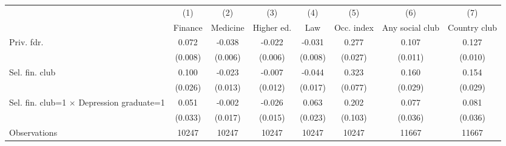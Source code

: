 \begin{tabular}{l*{7}{c}}
\toprule
                    &\multicolumn{1}{c}{(1)}&\multicolumn{1}{c}{(2)}&\multicolumn{1}{c}{(3)}&\multicolumn{1}{c}{(4)}&\multicolumn{1}{c}{(5)}&\multicolumn{1}{c}{(6)}&\multicolumn{1}{c}{(7)}\\
                    &\multicolumn{1}{c}{Finance}&\multicolumn{1}{c}{Medicine}&\multicolumn{1}{c}{Higher ed.}&\multicolumn{1}{c}{Law}&\multicolumn{1}{c}{Occ. index}&\multicolumn{1}{c}{Any social club}&\multicolumn{1}{c}{Country club}\\
\midrule
Priv. fdr.          &       0.072&      -0.038&      -0.022&      -0.031&       0.277&       0.107&       0.127\\
                    &     (0.008)&     (0.006)&     (0.006)&     (0.008)&     (0.027)&     (0.011)&     (0.010)\\
\addlinespace
Sel. fin. club      &       0.100&      -0.023&      -0.007&      -0.044&       0.323&       0.160&       0.154\\
                    &     (0.026)&     (0.013)&     (0.012)&     (0.017)&     (0.077)&     (0.029)&     (0.029)\\
\addlinespace
Sel. fin. club=1 $\times$ Depression graduate=1&       0.051&      -0.002&      -0.026&       0.063&       0.202&       0.077&       0.081\\
                    &     (0.033)&     (0.017)&     (0.015)&     (0.023)&     (0.103)&     (0.036)&     (0.036)\\
\midrule
Observations        &       10247&       10247&       10247&       10247&       10247&       11667&       11667\\
\bottomrule
\end{tabular}
